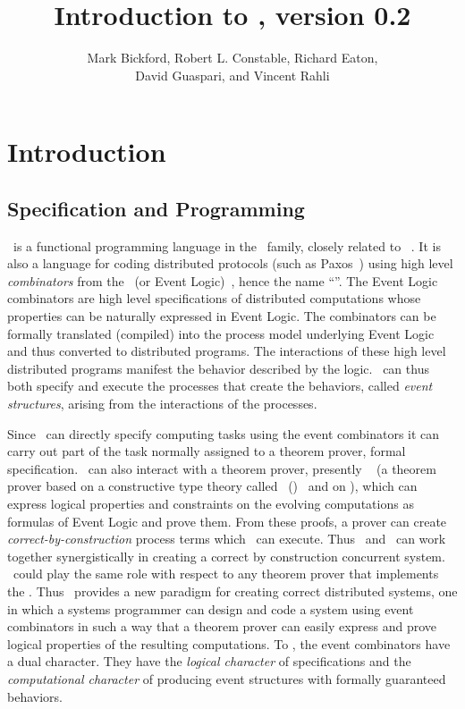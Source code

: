 \documentclass[final]{article}
\title{Introduction to \eml, version 0.2}
\author{Mark Bickford,
       Robert L. Constable,
       Richard Eaton,\\
       David Guaspari, and
       Vincent Rahli}
\begin{document}
\maketitle

\newpage

\tableofcontents

\newpage

\listoffixmes


\section{Introduction}


\subsection{Specification and Programming}

\eml\ is a functional programming language in the \ML\ family, closely
related to
\cml~\cite{Gordon+Milner+Wadsworth:1979,mi:ml-handbook84a,Kreitz+Rahli:2011}.
It is also a language for coding distributed protocols (such as
Paxos~\cite{VanRenesse:2011}) using high level \emph{combinators} from
the \logicE\ (or Event
Logic)~\cite{Bickford:2009,Bickford+Constable:2008}, hence the name
``\eml''.  The Event Logic combinators are high level specifications
of distributed computations whose properties can be naturally
expressed in Event Logic.  The combinators can be formally translated
(compiled) into the process model underlying Event Logic and thus
converted to distributed programs.  The interactions of these high
level distributed programs manifest the behavior described by the
logic. \eml\ can thus both specify and execute the processes that
create the behaviors, called \emph{event structures}, arising from the
interactions of the processes.

Since \eml\ can directly specify computing tasks using the event
combinators it can carry out part of the task normally assigned to a
theorem prover, formal specification.  \eml\ can also interact with a
theorem prover, presently
\nuprl~\cite{Constable+al:1986,Kreitz:02,Allen+al:2006} (a theorem
prover based on a constructive type theory called
\ctt\ (\CTT)~\cite{Constable+al:1986} and on \cml), which can express
logical properties and constraints on the evolving computations as
formulas of Event Logic and prove them.  From these proofs, a prover
can create \emph{correct-by-construction} process terms which
\eml\ can execute.  Thus \eml\ and \nuprl\ can work together
synergistically in creating a correct by construction concurrent
system.  \eml\ could play the same role with respect to any theorem
prover that implements the \logicE.  Thus \eml\ provides a new
paradigm for creating correct distributed systems, one in which a
systems programmer can design and code a system using event
combinators in such a way that a theorem prover can easily express and
prove logical properties of the resulting computations.
%
To \eml, the event combinators have a dual character.  They have the
\emph{logical character} of specifications and the \emph{computational
  character} of producing event structures with formally guaranteed
behaviors.
\end{document}
